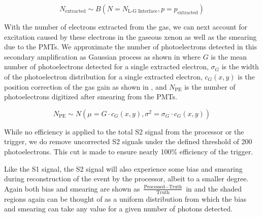 \begin{equation}
        \label{eqn:xe1t_binomial_ee}
        N_{\textrm{extracted}} \sim B \left( N= N_{\textrm{L-G Interface}}, p=p_{\textrm{extracted}} \right)
\end{equation}


With the number of electrons extracted from the gas, we can next account for excitation caused by these electrons in the gaseous xenon as well as the smearing due to the PMTs.  We approximate the number of photoelectrons detected in this secondary amplification as Gaussian process as shown in  where $G$ is the mean number of photoelectrons detected for a single extracted electron, $\sigma_G$ is the width of the photoelectron distribution for a single extracted electron, $c_{G}(x, y)$ is the position correction of the gas gain as shown in , and $N_{\textrm{PE}}$ is the number of photoelectrons digitized after smearing from the PMTs.

\begin{equation}
        \label{eqn:xe1t_gas_gain}
        N_{\textrm{PE}} \sim N(\mu=G \cdot c_{G}(x, y), \sigma^2=\sigma_G \cdot c_{G}(x, y))
\end{equation}


While no efficiency is applied to the total S2 signal from the processor or the trigger, we do remove uncorrected S2 signals under the defined threshold of 200 photoelectrons.  This cut is made to ensure nearly 100\% efficiency of the trigger.



Like the S1 signal, the S2 signal will also experience some bias and smearing during reconstruction of the event by the processor, albeit to a smaller degree.  Again both bias and smearing are shown as $\frac{\textrm{Processed} - \textrm{Truth}}{\textrm{Truth}}$ in  and the shaded regions again can be thought of as a uniform distribution from which the bias and smearing can take any value for a given number of photons detected.  

